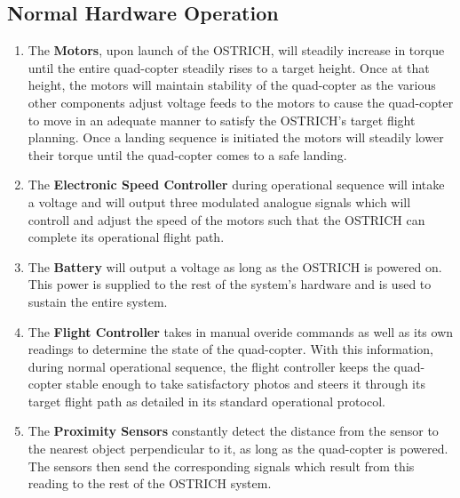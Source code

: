 \documentclass[10pt,letterpaper]{article}
\begin{document}
\subsection{Normal Hardware Operation}
	\begin{enumerate}[label=\textbf{NH\arabic*}]
        \item The \textbf{Motors}, upon launch of the OSTRICH, will steadily increase in torque until the entire quad-copter steadily rises to a target height. Once at that height, the motors will maintain stability of the quad-copter as the various other components adjust voltage feeds to the motors to cause the quad-copter to move in an adequate manner to satisfy the OSTRICH's target flight planning. Once a landing sequence is initiated the motors will steadily lower their torque until the quad-copter comes to a safe landing.\\
      
    	\item The \textbf{Electronic Speed Controller} during operational sequence will intake a voltage and will output three modulated analogue signals which will controll and adjust the speed of the motors such that the OSTRICH can complete its operational flight path. \\
    
    	\item The \textbf{Battery} will output a voltage as long as the OSTRICH is powered on. This power is supplied to the rest of the system's hardware and is used to sustain the entire system.\\
        
        \item The \textbf{Flight Controller} takes in manual overide commands as well as its own readings to determine the state of the quad-copter. With this information, during normal operational sequence, the flight controller keeps the quad-copter stable enough to take satisfactory photos and steers it through its target flight path as detailed in its standard operational protocol.\\
        
        \item The \textbf{Proximity Sensors} constantly detect the distance from the sensor to the nearest object perpendicular to it, as long as the quad-copter is powered. The sensors then send the corresponding signals which result from this reading to the rest of the OSTRICH system.\\
        

\end{enumerate}
\end{document}
